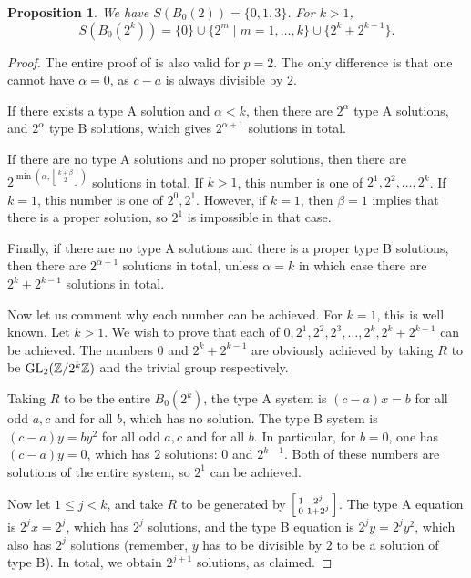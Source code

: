 \documentclass[10pt,leqno]{amsart}
\newcommand\sm[1]{\begin{bsmallmatrix}#1\end{bsmallmatrix}}
\newcommand{\Z}{\mathbb{Z}}
\newcommand{\GL}{\textnormal{GL}}
\newtheorem{proposition}[theorem]{Proposition}
\theoremstyle{definition}
\theoremstyle{remark}
\numberwithin{theorem}{section}
\begin{document}
\begin{proposition}
    We have $S(B_0(2))=\{0,1,3\}$. For $k>1$, $$S(B_0(2^k))=\{0\} \cup \{2^m \mid m=1,\ldots, k\}\cup \{2^k+2^{k-1}\}.$$ 
\end{proposition}

\begin{proof}
    The entire proof of  is also valid for $p=2$. The only difference is that one cannot have $\alpha=0$, as $c-a$ is always divisible by $2$. 

    If there exists a type A solution and $\alpha<k$, then there are $2^\alpha$ type A solutions, and $2^\alpha$ type B solutions, which gives $2^{\alpha+1}$ solutions in total.

    If there are no type A solutions and no proper solutions, then there are $2^{\min\left(\alpha, \left \lfloor \frac{k+\beta}{2}\right \rfloor\right)}$ solutions in total. If $k>1$, this number is one of $2^1, 2^2, \ldots, 2^k$.  If $k=1$, this number is one of $2^0, 2^1$. However, if $k=1$, then $\beta=1$ implies that there is a proper solution, so $2^1$ is impossible in that case.

    Finally, if there are no type A solutions and there is a proper type B solutions, then there are $2^{\alpha+1}$ solutions in total, unless $\alpha=k$ in which case there are $2^k+2^{k-1}$ solutions in total.

    Now let us comment why each number can be achieved. For $k=1$, this is well known. Let $k>1$. We wish to prove that each of $0,2^1,2^2, 2^3,\ldots, 2^k, 2^k+2^{k-1}$ can be achieved. The numbers $0$ and $2^k+2^{k-1}$ are obviously achieved by taking $R$ to be $\GL_2(\Z/2^k\Z)$ and the trivial group respectively.

    

    Taking $R$ to be the entire $B_0(2^k)$, the type A system is $(c-a)x=b$ for all odd $a,c$ and for all $b$, which has no solution. The type B system is $(c-a)y=by^2$ for all odd $a,c$ and for all $b$. In particular, for $b=0$, one has $(c-a)y=0$, which has $2$ solutions: $0$ and $2^{k-1}$. Both of these numbers are solutions of the entire system, so $2^1$ can be achieved.


    Now let $1\leq j<k$, and take $R$ to be generated by $\sm{1 & 2^j \\
    0 & 1+2^j}$. The type A equation is $2^jx=2^j$, which has $2^j$ solutions, and the type B equation is $2^jy=2^jy^2$, which also has $2^j$ solutions (remember, $y$ has to be divisible by $2$ to be a solution of type B). In total, we obtain $2^{j+1}$ solutions, as claimed.
\end{proof}
\end{document}
